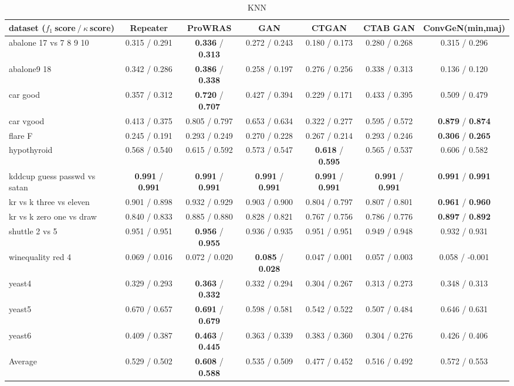 \begin{table*}[ht]\scriptsize\caption{KNN}\label{tab:results:KNN:A}\centering\tabularnewline
\begin{tabular}{l|@{\hskip3pt}c@{\hskip3pt}|@{\hskip3pt}c@{\hskip3pt}|@{\hskip3pt}c@{\hskip3pt}|@{\hskip3pt}c@{\hskip3pt}|@{\hskip3pt}c@{\hskip3pt}|@{\hskip3pt}c@{\hskip3pt}}\hline
\textbf{dataset ($f_1~$score$~/~\kappa~$score)} & \textbf{Repeater} & \textbf{ProWRAS} & \textbf{GAN} & \textbf{CTGAN} & \textbf{CTAB GAN} & \textbf{ConvGeN(min,maj)}
\tabularnewline
\hline
abalone 17 vs 7 8 9 10 &  0.315  /  0.291  &  \textbf{0.336}  /  \textbf{0.313}  &  0.272  /  0.243  &  0.180  /  0.173  &  0.280  /  0.268  &  0.315  /  0.296 
\tabularnewline
abalone9 18 &  0.342  /  0.286  &  \textbf{0.386}  /  \textbf{0.338}  &  0.258  /  0.197  &  0.276  /  0.256  &  0.338  /  0.313  &  0.136  /  0.120 
\tabularnewline
car good &  0.357  /  0.312  &  \textbf{0.720}  /  \textbf{0.707}  &  0.427  /  0.394  &  0.229  /  0.171  &  0.433  /  0.395  &  0.509  /  0.479 
\tabularnewline
car vgood &  0.413  /  0.375  &  0.805  /  0.797  &  0.653  /  0.634  &  0.322  /  0.277  &  0.595  /  0.572  &  \textbf{0.879}  /  \textbf{0.874} 
\tabularnewline
flare F &  0.245  /  0.191  &  0.293  /  0.249  &  0.270  /  0.228  &  0.267  /  0.214  &  0.293  /  0.246  &  \textbf{0.306}  /  \textbf{0.265} 
\tabularnewline
hypothyroid &  0.568  /  0.540  &  0.615  /  0.592  &  0.573  /  0.547  &  \textbf{0.618}  /  \textbf{0.595}  &  0.565  /  0.537  &  0.606  /  0.582 
\tabularnewline
kddcup guess passwd vs satan &  \textbf{0.991}  /  \textbf{0.991}  &  \textbf{0.991}  /  \textbf{0.991}  &  \textbf{0.991}  /  \textbf{0.991}  &  \textbf{0.991}  /  \textbf{0.991}  &  \textbf{0.991}  /  \textbf{0.991}  &  \textbf{0.991}  /  \textbf{0.991} 
\tabularnewline
kr vs k three vs eleven &  0.901  /  0.898  &  0.932  /  0.929  &  0.903  /  0.900  &  0.804  /  0.797  &  0.807  /  0.801  &  \textbf{0.961}  /  \textbf{0.960} 
\tabularnewline
kr vs k zero one vs draw &  0.840  /  0.833  &  0.885  /  0.880  &  0.828  /  0.821  &  0.767  /  0.756  &  0.786  /  0.776  &  \textbf{0.897}  /  \textbf{0.892} 
\tabularnewline
shuttle 2 vs 5 &  0.951  /  0.951  &  \textbf{0.956}  /  \textbf{0.955}  &  0.936  /  0.935  &  0.951  /  0.951  &  0.949  /  0.948  &  0.932  /  0.931 
\tabularnewline
winequality red 4 &  0.069  /  0.016  &  0.072  /  0.020  &  \textbf{0.085}  /  \textbf{0.028}  &  0.047  /  0.001  &  0.057  /  0.003  &  0.058  /  -0.001 
\tabularnewline
yeast4 &  0.329  /  0.293  &  \textbf{0.363}  /  \textbf{0.332}  &  0.332  /  0.294  &  0.304  /  0.267  &  0.313  /  0.273  &  0.348  /  0.313 
\tabularnewline
yeast5 &  0.670  /  0.657  &  \textbf{0.691}  /  \textbf{0.679}  &  0.598  /  0.581  &  0.542  /  0.522  &  0.507  /  0.484  &  0.646  /  0.631 
\tabularnewline
yeast6 &  0.409  /  0.387  &  \textbf{0.463}  /  \textbf{0.445}  &  0.363  /  0.339  &  0.383  /  0.360  &  0.304  /  0.276  &  0.426  /  0.406 
\tabularnewline
\hline Average &  0.529  /  0.502  &  \textbf{0.608}  /  \textbf{0.588}  &  0.535  /  0.509  &  0.477  /  0.452  &  0.516  /  0.492  &  0.572  /  0.553 
\tabularnewline
\hline\end{tabular}\end{table*}



